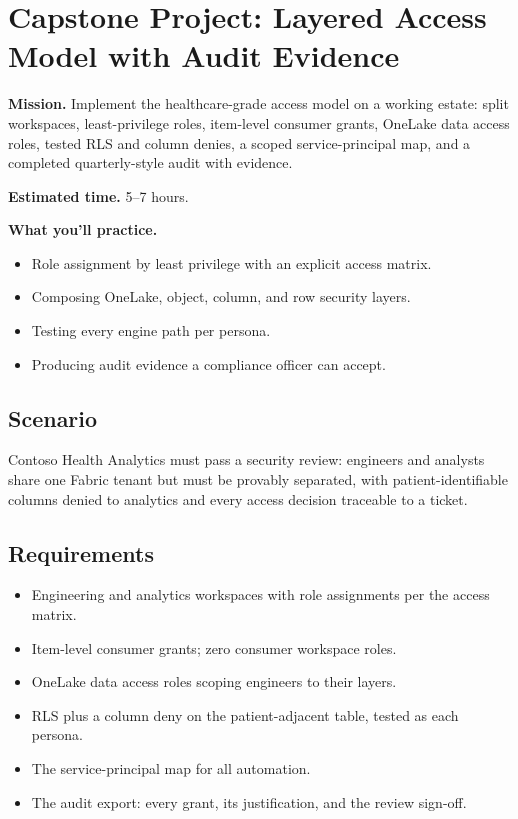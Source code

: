 \section{Capstone Project: Layered Access Model with Audit Evidence}\label{sec:ch21-capstone}

\begin{capstonebox}
\textbf{Mission.} Implement the healthcare-grade access model on a working estate: split workspaces, least-privilege roles, item-level consumer grants, OneLake data access roles, tested RLS and column denies, a scoped service-principal map, and a completed quarterly-style audit with evidence.

\textbf{Estimated time.} 5--7 hours.

\textbf{What you'll practice.}
\begin{itemize}
    \item Role assignment by least privilege with an explicit access matrix.
    \item Composing OneLake, object, column, and row security layers.
    \item Testing every engine path per persona.
    \item Producing audit evidence a compliance officer can accept.
\end{itemize}
\end{capstonebox}

\subsection*{Scenario}
Contoso Health Analytics must pass a security review: engineers and analysts share one Fabric tenant but must be provably separated, with patient-identifiable columns denied to analytics and every access decision traceable to a ticket.

\subsection*{Requirements}
\begin{itemize}
    \item Engineering and analytics workspaces with role assignments per the access matrix.
    \item Item-level consumer grants; zero consumer workspace roles.
    \item OneLake data access roles scoping engineers to their layers.
    \item RLS plus a column deny on the patient-adjacent table, tested as each persona.
    \item The service-principal map for all automation.
    \item The audit export: every grant, its justification, and the review sign-off.
\end{itemize}

